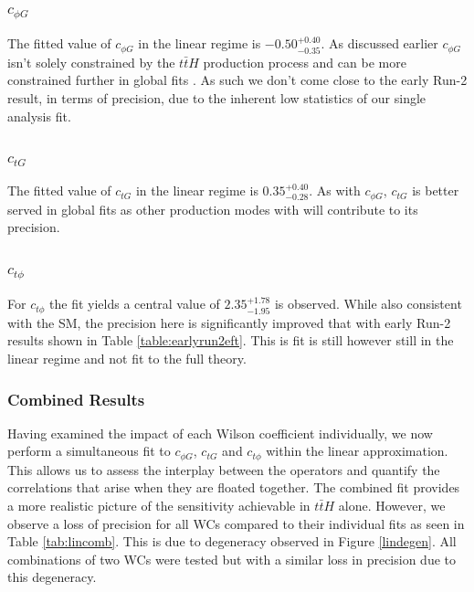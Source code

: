 \subsubsection{$c_{\phi G}$}

 The fitted value of $c_{\phi G}$ in the linear regime is $-0.50^{+0.40}_{-0.35}$. As discussed earlier $c_{\phi G}$ isn't solely constrained by the $t\bar{t}H$ production process and can be more constrained further in global fits \cite{SMEFT_global}. As such we don't come close to the early Run-2 result, in terms of precision, due to the inherent low statistics of our single analysis fit.

\subsubsection{$c_{tG}$}

The fitted value of $c_{t G}$ in the linear regime is $0.35^{+0.40}_{-0.28}$. As with $c_{\phi G}$, $c_{t G}$ is better served in global fits as other production modes with will contribute to its precision.  


\subsubsection{$c_{t\phi}$}
For $c_{t\phi}$ the fit yields a central value of $2.35^{+1.78}_{-1.95}$ is observed. While also consistent with the SM, the precision here is significantly improved that with early Run-2 results shown in Table \ref{table:earlyrun2eft}. This is fit is still however still in the linear regime and not fit to the full theory. 
\subsubsection{Combined Results}
Having examined the impact of each Wilson coefficient individually, we now perform a simultaneous fit to $c_{\phi G}$, $c_{tG}$ and $c_{t\phi}$ within the linear approximation. This allows us to assess the interplay between the operators and quantify the correlations that arise when they are floated together. The combined fit provides a more realistic picture of the sensitivity achievable in $t\bar{t}H$ alone. However, we observe a loss of precision for all WCs compared to their individual fits as seen in Table \ref{tab:lincomb}. This is due to degeneracy observed in Figure \ref{lindegen}. All combinations of two WCs were tested but with a similar loss in precision due to this degeneracy.

